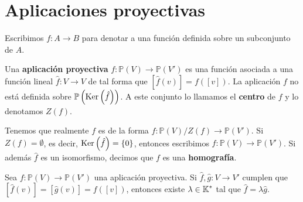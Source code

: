 \section{Aplicaciones proyectivas}
Escribimos $\displaystyle f : A \to B $ para denotar a una función definida sobre un subconjunto de $\displaystyle A $. 
\begin{definition}
	Una \textbf{aplicación proyectiva} $\displaystyle f : \mathbb{P}\left(V\right) \to \mathbb{P}\left(V'\right) $ es una función asociada a una función lineal $\displaystyle \hat{f}: V \to V $ de tal forma que $\displaystyle [\hat{f}(v)] = f\left([v]\right) $. La aplicación $\displaystyle f $ no está definida sobre $\displaystyle \mathbb{P}\left(\operatorname{Ker}\left(\hat{f}\right)\right) $. A este conjunto lo llamamos el \textbf{centro} de $\displaystyle f $ y lo denotamos $\displaystyle Z\left(f\right) $. 
\end{definition}
\begin{observation}
	Tenemos que realmente $\displaystyle f $ es de la forma $\displaystyle f : \mathbb{P}\left(V\right)/Z\left(f\right) \to \mathbb{P}\left(V'\right) $. Si $\displaystyle Z\left(f\right) = \emptyset $, es decir, $\displaystyle \operatorname{Ker}\left(\hat{f}\right) = \left\{ 0\right\}  $, entonces escribimos $\displaystyle f : \mathbb{P}\left(V\right) \to \mathbb{P}\left(V'\right) $. 
	Si además $\displaystyle \hat{f} $ es un isomorfismo, decimos que $\displaystyle f $ es una \textbf{homografía}. 
\end{observation}
\begin{prop}
	Sea $\displaystyle f : \mathbb{P}\left(V\right) \to \mathbb{P}\left(V'\right) $ una aplicación proyectiva. Si $\displaystyle \hat{f},\hat{g} : V \to V' $ cumplen que $\displaystyle \left[\hat{f}\left(v\right)\right]  = \left[\hat{g}\left(v\right)\right] = f\left([v]\right)$, entonces existe $\displaystyle \lambda \in \mathbb{K}^{*} $ tal que $\displaystyle \hat{f} = \lambda \hat{g} $.
\end{prop}

